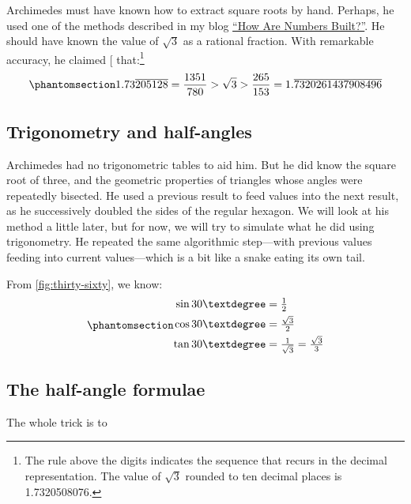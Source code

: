\documentclass[
  a4paper,
]{article}
\begin{document}
Archimedes must have known how to extract square roots by hand. Perhaps,
he used one of the methods described in my blog
\href{https://swanlotus.netlify.app/blogs/how-are-numbers-built}{``How
Are Numbers Built?''}. He should have known the value of \(\sqrt{3}\) as
a rational fraction. With remarkable accuracy, he claimed
{[}\citeproc{ref-heath2002}{4}{]} that:\footnote{The rule above the
  digits indicates the sequence that recurs in the decimal
  representation. The value of \(\sqrt{3}\) rounded to ten decimal
  places is 1.7320508076.}
\begin{equation}\phantomsection\label{eq:sqrt3}{
1.73\overline{205128} = \frac{1351}{780} > \sqrt{3} > \frac{265}{153} = 1.\overline{7320261437908496}
}\end{equation}

\subsection{Trigonometry and
half-angles}\label{trigonometry-and-half-angles}

Archimedes had no trigonometric tables to aid him. But he did know the
square root of three, and the geometric properties of triangles whose
angles were repeatedly bisected. He used a previous result to feed
values into the next result, as he successively doubled the sides of the
regular hexagon. We will look at his method a little later, but for now,
we will try to simulate what he did using trigonometry. He repeated the
same algorithmic step---with previous values feeding into current
values---which is a bit like a snake eating its own tail.

From \cref{fig:thirty-sixty}, we know:
\begin{equation}\phantomsection\label{eq:three-six-nine}{
\begin{aligned}
\sin 30° &= \tfrac{1}{2}\\
\cos 30° &= \tfrac{\sqrt{3}}{2}\\
\tan 30° &= \tfrac{1}{\sqrt{3}} = \tfrac{\sqrt{3}}{3}\\
\end{aligned}
}\end{equation}

\subsection{The half-angle formulae}\label{the-half-angle-formulae}

The whole trick is to
\end{document}
